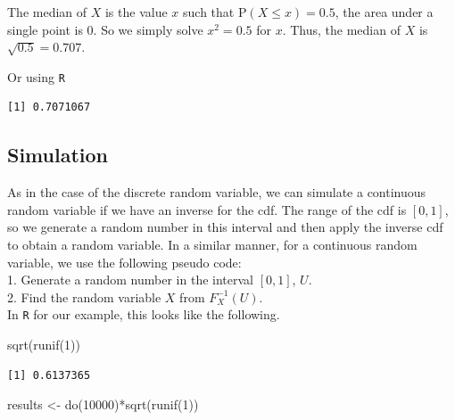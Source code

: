 \documentclass[
  letterpaper,
  DIV=11,
  numbers=noendperiod]{scrreprt}
\newenvironment{Shaded}{\begin{snugshade}}{\end{snugshade}}
\newcommand{\ControlFlowTok}[1]{\textcolor[rgb]{0.00,0.23,0.31}{#1}}
\newcommand{\DecValTok}[1]{\textcolor[rgb]{0.68,0.00,0.00}{#1}}
\newcommand{\FunctionTok}[1]{\textcolor[rgb]{0.28,0.35,0.67}{#1}}
\newcommand{\NormalTok}[1]{\textcolor[rgb]{0.00,0.23,0.31}{#1}}
\newcommand{\OtherTok}[1]{\textcolor[rgb]{0.00,0.23,0.31}{#1}}
\newcommand{\SpecialCharTok}[1]{\textcolor[rgb]{0.37,0.37,0.37}{#1}}
\begin{document}
The median of \(X\) is the value \(x\) such that
\(\mbox{P}(X\leq x)=0.5\), the area under a single point is 0. So we
simply solve \(x^2=0.5\) for \(x\). Thus, the median of \(X\) is
\(\sqrt{0.5}=0.707\).

Or using \texttt{R}

\begin{Shaded}
\end{Shaded}

\begin{verbatim}
[1] 0.7071067
\end{verbatim}

\subsection{Simulation}\label{simulation-1}

As in the case of the discrete random variable, we can simulate a
continuous random variable if we have an inverse for the cdf. The range
of the cdf is \([0,1]\), so we generate a random number in this interval
and then apply the inverse cdf to obtain a random variable. In a similar
manner, for a continuous random variable, we use the following pseudo
code:\\
1. Generate a random number in the interval \([0,1]\), \(U\).\\
2. Find the random variable \(X\) from \(F_{X}^{-1}(U)\).\\
In \texttt{R} for our example, this looks like the following.

\begin{Shaded}
\begin{Highlighting}[]
\FunctionTok{sqrt}\NormalTok{(}\FunctionTok{runif}\NormalTok{(}\DecValTok{1}\NormalTok{))}
\end{Highlighting}
\end{Shaded}

\begin{verbatim}
[1] 0.6137365
\end{verbatim}

\begin{Shaded}
\begin{Highlighting}[]
\NormalTok{results }\OtherTok{\textless{}{-}} \FunctionTok{do}\NormalTok{(}\DecValTok{10000}\NormalTok{)}\SpecialCharTok{*}\FunctionTok{sqrt}\NormalTok{(}\FunctionTok{runif}\NormalTok{(}\DecValTok{1}\NormalTok{))}
\end{Highlighting}
\end{Shaded}
\end{document}
